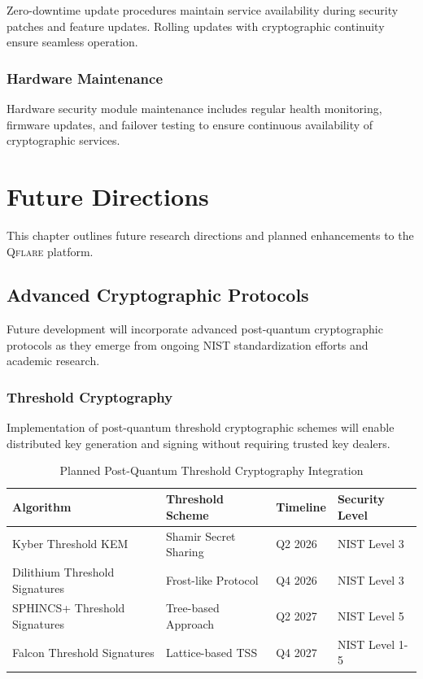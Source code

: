 \documentclass[12pt,a4paper,twoside]{book}
\newcommand{\qflare}{\textsc{Qflare}}
\begin{document}
Zero-downtime update procedures maintain service availability during security patches and feature updates. Rolling updates with cryptographic continuity ensure seamless operation.

\subsection{Hardware Maintenance}
\label{subsec:hardware-maintenance}

Hardware security module maintenance includes regular health monitoring, firmware updates, and failover testing to ensure continuous availability of cryptographic services.

\chapter{Future Directions}
\label{ch:future}

This chapter outlines future research directions and planned enhancements to the \qflare{} platform.

\section{Advanced Cryptographic Protocols}
\label{sec:advanced-crypto}

Future development will incorporate advanced post-quantum cryptographic protocols as they emerge from ongoing NIST standardization efforts and academic research.

\subsection{Threshold Cryptography}
\label{subsec:threshold-crypto}

Implementation of post-quantum threshold cryptographic schemes will enable distributed key generation and signing without requiring trusted key dealers.

\begin{table}[htbp]
\centering
\caption{Planned Post-Quantum Threshold Cryptography Integration}
\label{tab:threshold-crypto-roadmap}
\begin{tabular}{@{}llll@{}}
\toprule
\textbf{Algorithm} & \textbf{Threshold Scheme} & \textbf{Timeline} & \textbf{Security Level} \\
\midrule
Kyber Threshold KEM & Shamir Secret Sharing & Q2 2026 & NIST Level 3 \\
Dilithium Threshold Signatures & Frost-like Protocol & Q4 2026 & NIST Level 3 \\
SPHINCS+ Threshold Signatures & Tree-based Approach & Q2 2027 & NIST Level 5 \\
Falcon Threshold Signatures & Lattice-based TSS & Q4 2027 & NIST Level 1-5 \\
\bottomrule
\end{tabular}
\end{table}
\end{document}
